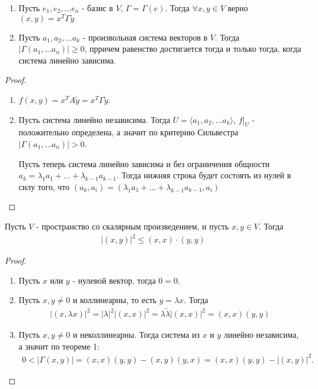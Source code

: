 \begin{theorem}
    \begin{enumerate}
        \item
        Пусть $e_1, e_2, \dots e_n$ - базис в $V$, $\Gamma = \Gamma(e)$. Тогда $\forall x, y \in V$ верно 
        $(x, y) = x^T \Gamma \tilde{y}$
        \item Пусть $a_1, a_2, \dots a_k$ - произвольная система векторов в $V$. Тогда $|\Gamma(a_1, \dots a_n)| \geq 0$, 
        прричем равенство достигается тогда и только тогда, когда система линейно зависима.
    \end{enumerate}
\end{theorem}

\begin{proof}
    \begin{enumerate}
        \item $f(x, y) = x^T A \tilde{y} = x^T \Gamma \tilde{y}$.
        \item Пусть система линейно независима. Тогда $U = \langle a_1, a_2, \dots a_k \rangle$, 
        $f \vert_{U}$ - положительно определена, а значит по критерию Сильвестра $|\Gamma(a_1, \dots a_n)| > 0$.

        Пусть теперь система линейно зависима и без ограничения общности $a_k = \lambda_1 a_1 + \dots + \lambda_{k-1} a_{k-1}$.
        Тогда нижняя строка будет состоять из нулей в силу того, что $(a_k, a_i) = (\lambda_1 a_1 + \dots + \lambda_{k-1} a_{k-1}, a_i)$
    \end{enumerate}
\end{proof}

\begin{theorem}
    Пусть $V$ - пространство со скалярным произведением, и пусть $x, y \in V$. Тогда 
    \begin{gather*}
        |(x, y)|^2 \leq (x, x) \cdot (y, y)
    \end{gather*}
\end{theorem}

\begin{proof}
    \begin{enumerate}
        \item Пусть $x$ или $y$ - нулевой вектор, тогда $0 = 0$.
        \item Пусть $x, y \neq 0$ и коллинеарны, то есть $y = \lambda x$. Тогда 
        \begin{gather*}
            |(x, \lambda x)|^2 = |\lambda|^2 |(x, x)|^2 = \lambda \tilde{\lambda} |(x, x)|^2 = 
            (x, x) (y, y)
        \end{gather*}
        \item Пусть $x, y \neq 0$ и неколлинеарны. Тогда система из $x$ и $y$ линейно независима, а значит 
        по теореме 1:
        \begin{gather*}
            0 < |\Gamma(x, y)| = (x, x)(y, y) - (x, y)(y, x) = (x, x)(y, y) - |(x, y)|^2.
        \end{gather*}
    \end{enumerate}
\end{proof}

